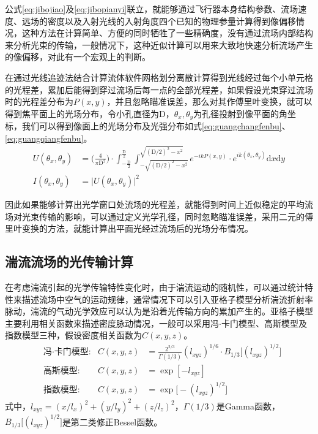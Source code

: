 公式\eqref{eq:jibojiao}及\eqref{eq:jibopianyi}联立，就能够通过飞行器本身结构参数、流场速度、远场的密度以及入射光线的入射角度四个已知的物理参量计算得到像偏移情况，这种方法在计算简单、方便的同时牺牲了一些精确度，没有通过流场内部结构来分析光束的传输，一般情况下，这种近似计算可以用来大致地快速分析流场产生的像偏移，对此有一个宏观上的判断。

在通过光线追迹法结合计算流体软件网格划分离散计算得到光线经过每个小单元格的光程差，累加后能得到穿过流场后每一点的全部光程差，如果假设光束穿过流场时的光程差分布为$P(x,y)$，并且忽略瞄准误差，那么对其作傅里叶变换，就可以得到焦平面上的光场分布，令小孔直径为D，$\theta_x,\theta_y$为孔径投射到像平面的角坐标，我们可以得到像面上的光场分布及光强分布如式\eqref{eq:guangchangfenbu}、\eqref{eq:guangqiangfenbu}。
\begin{align}
U(\theta_x,\theta_y)&=\bigg(\frac{4}{\pi\text{D}^2}\bigg)\cdot\int_{-\frac{\text{D}}{2}}^{\frac{\text{D}}{2}}\int_{-\sqrt{(\text{D}/2)^2-x^2}}^{\sqrt{(\text{D}/2)^2-x^2}} e^{-ikP(x,y)}\cdot e^{ik(\theta_x,\theta_y)}\text{d}x\text{d}y
\label{eq:guangchangfenbu}\\
I(\theta_x,\theta_y)&=\big|U(\theta_x,\theta_y)\big|^2
\label{eq:guangqiangfenbu}
\end{align}

因此如果能够计算出光学窗口处流场的光程差，就能得到时间上近似稳定的平均流场对光束传输的影响，可以通过定义光学孔径，同时忽略瞄准误差，采用二元的傅里叶变换的方法，就能计算出平面光经过流场后的光场分布情况。
\subsection{湍流流场的光传输计算}
在考虑湍流引起的光学传输特性变化时，由于湍流运动的随机性，可以通过统计特性来描述流场中空气的运动规律，通常情况下可以引入亚格子模型分析湍流折射率脉动，湍流的气动光学效应可以认为是沿着光传输方向的累加产生的。亚格子模型主要利用相关函数来描述密度脉动情况，一般可以采用冯$\cdot$卡门模型、高斯模型及指数模型三种，假设密度相关函数为$C(x,y,z)$。
\begin{align}
&\text{冯$\cdot$卡门模型:}
&C(x,y,z)&=\frac{2^{2/3}}{\Gamma(1/3)}(l_{xyz})^{1/6}\cdot B_{1/3}\big[(l_{xyz})^{1/2}\big]\\
&\text{高斯模型:}
&C(x,y,z)&=\exp[-l_{xyz}]\\
&\text{指数模型:}
&C(x,y,z)&=\exp\big[-(l_{xyz})^{1/2}\big]\label{eq:zhishuxiangguanxishu}
\end{align}
式中，$l_{xyz}=(x/l_x)^2+(y/l_y)^2+(z/l_z)^2$，$\Gamma(1/3)$是Gamma函数，$B_{1/3}\big[(l_{xyz})^{1/2}\big]$是第二类修正Bessel函数。

